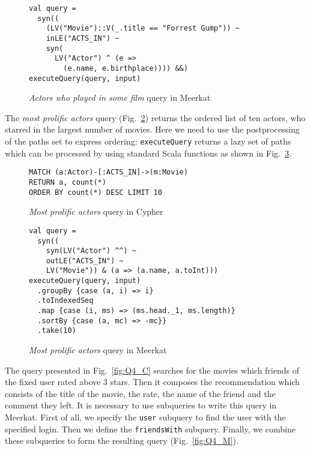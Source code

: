 \begin{figure}[!h]
\begin{lstlisting}
val query =
  syn((
    (LV("Movie")::V(_.title == "Forrest Gump")) ~
    inLE("ACTS_IN") ~
    syn(
      LV("Actor") ^ (e =>
        (e.name, e.birthplace)))) &&)
executeQuery(query, input)
\end{lstlisting}
\caption{\emph{Actors who played in some film} query in Meerkat}
\label{fig:Q1_M}
\end{figure}

The \emph{most prolific actors} query (Fig.~\ref{fig:Q2_C}) returns the ordered list of ten actors, who starred in the largest number of movies.
Here we need to use the postprocessing of the paths set to express ordering: \lstinline{executeQuery} returns a lazy set of paths which can be processed by using standard Scala functions as shown in Fig.~\ref{fig:Q2_M}.

\begin{figure}[!h]
\begin{lstlisting}
MATCH (a:Actor)-[:ACTS_IN]->(m:Movie)
RETURN a, count(*)
ORDER BY count(*) DESC LIMIT 10
\end{lstlisting}
\caption{\emph{Most prolific actors} query in Cypher}
\label{fig:Q2_C}
\end{figure}

\begin{figure}[!h]
\begin{lstlisting}
val query =
  syn((
    syn(LV("Actor") ^^) ~
    outLE("ACTS_IN") ~
    LV("Movie")) & (a => (a.name, a.toInt)))
executeQuery(query, input)
  .groupBy {case (a, i) => i}
  .toIndexedSeq
  .map {case (i, ms) => (ms.head._1, ms.length)}
  .sortBy {case (a, mc) => -mc}}
  .take(10)
\end{lstlisting}
\caption{\emph{Most prolific actors} query in Meerkat}
\label{fig:Q2_M}
\end{figure}

The query presented in Fig.~\ref{fig:Q4_C} searches for the movies which friends of the fixed user rated above 3 stars.
Then it composes the recommendation which consists of the title of the movie, the rate, the name of the friend and the comment they left.
It is necessary to use subqueries to write this query in Meerkat.
First of all, we specify the \lstinline{user} subquery to find the user with the specified login.
Then we define the \lstinline{friendsWith} subquery.
Finally, we combine these subqueries to form the resulting query (Fig.~\ref{fig:Q4_M}).

